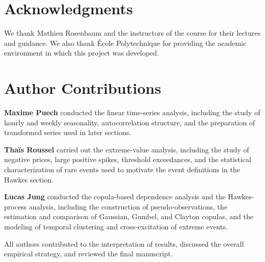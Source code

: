 \documentclass[11pt, a4paper]{article}
\theoremstyle{remark}
\begin{document}
\section*{Acknowledgments}

We thank Mathieu Rosenbaum and the instructors of the course for their lectures and guidance. We also thank École Polytechnique for providing the academic environment in which this project was developed.

\section*{Author Contributions}

\textbf{Maxime Puech} conducted the linear time-series analysis, including the study of hourly and weekly seasonality, autocorrelation structure, and the preparation of transformed series used in later sections.

\textbf{Thaïs Roussel} carried out the extreme-value analysis, including the study of negative prices, large positive spikes, threshold exceedances, and the statistical characterization of rare events used to motivate the event definitions in the Hawkes section.

\textbf{Lucas Jung} conducted the copula-based dependence analysis and the Hawkes-process analysis, including the construction of pseudo-observations, the estimation and comparison of Gaussian, Gumbel, and Clayton copulas, and the modeling of temporal clustering and cross-excitation of extreme events.

All authors contributed to the interpretation of results, discussed the overall empirical strategy, and reviewed the final manuscript.


\clearpage
\processdelayedfloats
\end{document}
